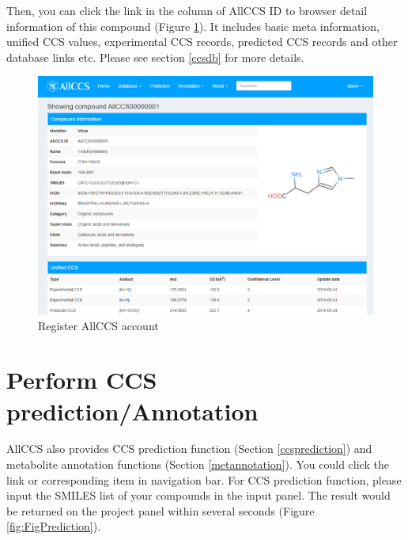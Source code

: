 \documentclass[12pt,]{book}
\theoremstyle{definition}
\theoremstyle{definition}
\theoremstyle{definition}
\theoremstyle{remark}
\begin{document}
Then, you can click the link in the column of AllCCS ID to browser
detail information of this compound (Figure \ref{fig:FigBrowser2}). It
includes basic meta information, unified CCS values, experimental CCS
records, predicted CCS records and other database links etc. Please see
section \ref{ccsdb} for more details.

\begin{figure}

{\centering \includegraphics{images/chapter1/browser_2} 

}

\caption{Register AllCCS account}\label{fig:FigBrowser2}
\end{figure}

\section{Perform CCS
prediction/Annotation}\label{perform-ccs-predictionannotation}

AllCCS also provides CCS prediction function (Section
\ref{ccsprediction}) and metabolite annotation functions (Section
\ref{metannotation}). You could click the link or corresponding item in
navigation bar. For CCS prediction function, please input the SMILES
list of your compounds in the input panel. The result would be returned
on the project panel within several seconds (Figure
\ref{fig:FigPrediction}).
\end{document}
